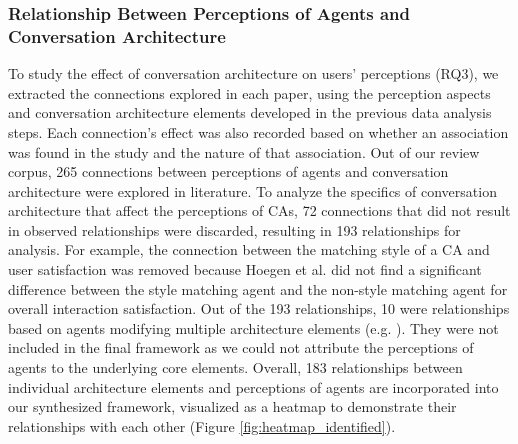 \subsubsection*{Relationship Between Perceptions of Agents and Conversation Architecture}



To study the effect of conversation architecture on users' perceptions (RQ3), we extracted the connections explored in each paper, using the perception aspects and conversation architecture elements developed in the previous data analysis steps. Each connection's effect was also recorded based on whether an association was found in the study and the nature of that association. Out of our review corpus, 265 connections between perceptions of agents and conversation architecture were explored in literature. To analyze the specifics of conversation architecture that affect the perceptions of CAs, 72 connections that did not result in observed relationships were discarded, resulting in 193 relationships for analysis. For example, the connection between the matching style of a CA and user satisfaction was removed because Hoegen et al. \cite{hoegen2019end}\cmt{[31]} did not find a significant difference between the style matching agent and the non-style matching agent for overall interaction satisfaction. Out of the 193 relationships, 10 were relationships based on agents modifying multiple architecture elements (e.g. \cite{seeger2021chatbots}\cmt{[35]}\cite{volkel2021manipulating}\cmt{[68]}). They were not included in the final framework as we could not attribute the perceptions of agents to the underlying core elements. Overall, 183 relationships between individual architecture elements and perceptions of agents are incorporated into our synthesized framework, visualized as a heatmap to demonstrate their relationships with each other (Figure \ref{fig:heatmap_identified}).
